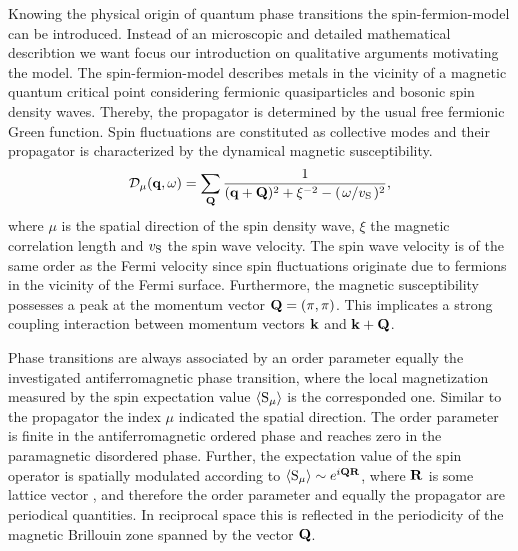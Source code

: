Knowing the physical origin of quantum phase transitions the spin-fermion-model can be introduced.
Instead of an microscopic and detailed mathematical describtion we want focus our introduction on qualitative arguments motivating the model.
The spin-fermion-model describes metals in the vicinity of a magnetic quantum critical point considering fermionic quasiparticles and bosonic spin density waves.
Thereby, the propagator is determined by the usual free fermionic Green function.
Spin fluctuations are constituted as collective modes and their propagator is characterized by the dynamical magnetic susceptibility.
%
\begin{align}
	\mathcal{D}_{\mu}(\vb{q}, \omega) = \sum\limits_{\vb{Q}} \frac{1}{(\vb{q}+\vb{Q})^{2} + \xi^{-2} - (\flatfrac{\omega}{v_{\mt{S}}})^{2}},
	\label{eq:undamped spin propagator}
\end{align}
%
where $\mu$ is the spatial direction of the spin density wave, $\xi$ the magnetic correlation length and $v_{\mathrm{S}}$ the spin wave velocity.
The spin wave velocity is of the same order as the Fermi velocity since spin fluctuations originate due to fermions in the vicinity of the Fermi surface.
Furthermore, the magnetic susceptibility possesses a peak at the momentum vector $\vb{Q} = (\pi, \pi)$.
This implicates a strong coupling interaction between momentum vectors $\vb{k}$ and $\vb{k} + \vb{Q}$.

Phase transitions are always associated by an order parameter equally the investigated antiferromagnetic phase transition, where the local magnetization measured by the spin expectation value $\expval{\mt{S}_{\mu}}$ is the corresponded one.
Similar to the propagator the index $\mu$ indicated the spatial direction.
The order parameter is finite in the antiferromagnetic ordered phase and reaches zero in the paramagnetic disordered phase.
Further, the expectation value of the spin operator is spatially modulated according to $\expval{\mt{S}_{\mu}} \sim e^{i\vb{Q}\vb{R}}$, where $\vb{R}$ is some lattice vector \cite{Weiss}, and therefore the order parameter and equally the propagator are periodical quantities.
In reciprocal space this is reflected in the periodicity  of the magnetic Brillouin zone spanned by the vector $\vb{Q}$.

